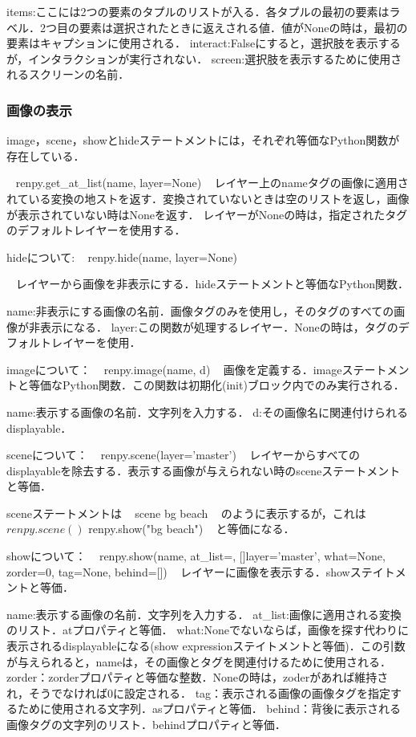 \documentclass[a4paper]{jarticle}
\begin{document}
   items:ここには2つの要素のタプルのリストが入る．各タプルの最初の要素はラベル．2つ目の要素は選択されたときに返えされる値．値がNoneの時は，最初の要素はキャプションに使用される．
   interact:Falseにすると，選択肢を表示するが，インタラクションが実行されない．
   screen:選択肢を表示するために使用されるスクリーンの名前．

  \subsubsection{画像の表示}
   image，scene，showとhideステートメントには，それぞれ等価なPython関数が存在している．

    ~
    renpy.get_at_list(name, layer=None)   
    ~
    レイヤー上のnameタグの画像に適用されている変換の地ストを返す．変換されていないときは空のリストを返し，画像が表示されていない時はNoneを返す．
   レイヤーがNoneの時は，指定されたタグのデフォルトレイヤーを使用する．

   hideについて:
   ~
renpy.hide(name, layer=None)
   
   ~
   レイヤーから画像を非表示にする．hideステートメントと等価なPython関数．

    name:非表示にする画像の名前．画像タグのみを使用し，そのタグのすべての画像が非表示になる．
    layer:この関数が処理するレイヤー．Noneの時は，タグのデフォルトレイヤーを使用．

    imageについて：
    ~
    renpy.image(name, d)
    ~
    画像を定義する．imageステートメントと等価なPython関数．この関数は初期化(init)ブロック内でのみ実行される．

    name:表示する画像の名前．文字列を入力する．
    d:その画像名に関連付けられるdisplayable．

    sceneについて：
    ~
    renpy.scene(layer='master')
    ~
    レイヤーからすべてのdisplayableを除去する．表示する画像が与えられない時のsceneステートメントと等価．

    sceneステートメントは
    ~
    scene bg beach
    ~
    のように表示するが，これは
    ~
    $ renpy.scene()
    $ renpy.show("bg beach")
    ~
    と等価になる．

    showについて：
    ~
    renpy.show(name, at_list=, []layer='master', what=None, zorder=0, tag=None, behind=[])
    ~
    レイヤーに画像を表示する．showステイトメントと等価．

    name:表示する画像の名前．文字列を入力する．
    at_list:画像に適用される変換のリスト．atプロパティと等価．
    what:Noneでないならば，画像を探す代わりに表示されるdisplayableになる(show expressionステイトメントと等価)．この引数が与えられると，nameは，その画像とタグを関連付けるために使用される．
    zorder：zorderプロパティと等価な整数．Noneの時は，zoderがあれば維持され，そうでなければ0に設定される．
    tag：表示される画像の画像タグを指定するために使用される文字列．asプロパティと等価．
    behind：背後に表示される画像タグの文字列のリスト．behindプロパティと等価．
\end{document}
